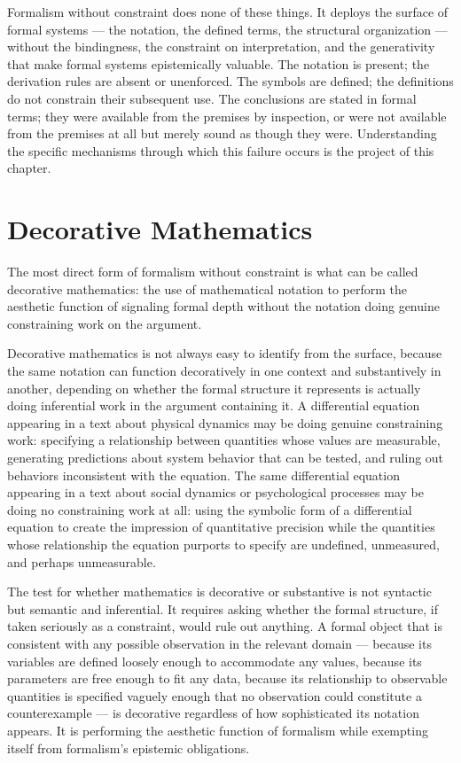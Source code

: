 \documentclass[12pt, openright, twoside]{book}
\begin{document}
Formalism without constraint does none of these things. It deploys
the surface of formal systems --- the notation, the defined terms,
the structural organization --- without the bindingness, the
constraint on interpretation, and the generativity that make formal
systems epistemically valuable. The notation is present; the
derivation rules are absent or unenforced. The symbols are defined;
the definitions do not constrain their subsequent use. The conclusions
are stated in formal terms; they were available from the premises by
inspection, or were not available from the premises at all but merely
sound as though they were. Understanding the specific mechanisms
through which this failure occurs is the project of this chapter.

\section{Decorative Mathematics}

The most direct form of formalism without constraint is what can
be called decorative mathematics: the use of mathematical notation
to perform the aesthetic function of signaling formal depth without
the notation doing genuine constraining work on the argument.

Decorative mathematics is not always easy to identify from the
surface, because the same notation can function decoratively in
one context and substantively in another, depending on whether
the formal structure it represents is actually doing inferential
work in the argument containing it. A differential equation
appearing in a text about physical dynamics may be doing genuine
constraining work: specifying a relationship between quantities
whose values are measurable, generating predictions about system
behavior that can be tested, and ruling out behaviors inconsistent
with the equation. The same differential equation appearing in a
text about social dynamics or psychological processes may be
doing no constraining work at all: using the symbolic form of
a differential equation to create the impression of quantitative
precision while the quantities whose relationship the equation
purports to specify are undefined, unmeasured, and perhaps
unmeasurable.

The test for whether mathematics is decorative or substantive
is not syntactic but semantic and inferential. It requires asking
whether the formal structure, if taken seriously as a constraint,
would rule out anything. A formal object that is consistent with
any possible observation in the relevant domain --- because its
variables are defined loosely enough to accommodate any values,
because its parameters are free enough to fit any data, because
its relationship to observable quantities is specified vaguely
enough that no observation could constitute a counterexample ---
is decorative regardless of how sophisticated its notation appears.
It is performing the aesthetic function of formalism while
exempting itself from formalism's epistemic obligations.
\end{document}
